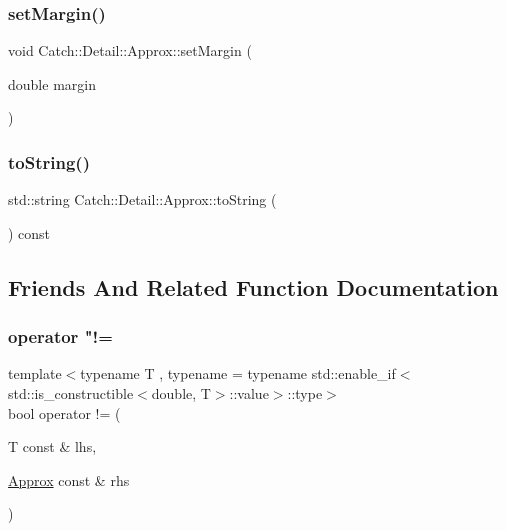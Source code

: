 \mbox{\label{class_catch_1_1_detail_1_1_approx_aff04b8b32edc707138eb395ed45ec576}} 
\subsubsection{\texorpdfstring{setMargin()}{setMargin()}}
{\footnotesize\ttfamily void Catch\+::\+Detail\+::\+Approx\+::set\+Margin (\begin{DoxyParamCaption}\item[{double}]{margin }\end{DoxyParamCaption})\hspace{0.3cm}{\ttfamily [private]}}

\mbox{\label{class_catch_1_1_detail_1_1_approx_a972fd9ac60607483263f1b0f0f9955e6}} 
\subsubsection{\texorpdfstring{toString()}{toString()}}
{\footnotesize\ttfamily std\+::string Catch\+::\+Detail\+::\+Approx\+::to\+String (\begin{DoxyParamCaption}{ }\end{DoxyParamCaption}) const}



\subsection{Friends And Related Function Documentation}
\mbox{\label{class_catch_1_1_detail_1_1_approx_ad878de1a82eb134e32d3434bb3fddd54}} 
\subsubsection{\texorpdfstring{operator "!=}{operator !=}\hspace{0.1cm}{\footnotesize\ttfamily [1/2]}}
{\footnotesize\ttfamily template$<$typename T , typename  = typename std\+::enable\+\_\+if$<$std\+::is\+\_\+constructible$<$double, T$>$\+::value$>$\+::type$>$ \\
bool operator != (\begin{DoxyParamCaption}\item[{T const \&}]{lhs,  }\item[{\mbox{\hyperlink{class_catch_1_1_detail_1_1_approx}{Approx}} const \&}]{rhs }\end{DoxyParamCaption})\hspace{0.3cm}{\ttfamily [friend]}}

